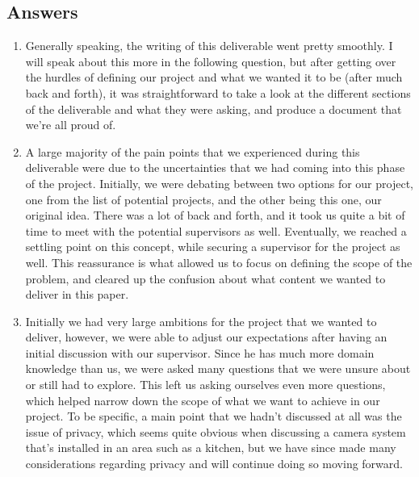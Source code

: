 \documentclass{article}
\begin{document}
\subsection*{Answers}
\begin{enumerate}
\item Generally speaking, the writing of this deliverable went pretty smoothly. I will speak about this more in the following question, but after getting over the hurdles of defining our project and what we wanted it to be (after much back and forth), it was straightforward to take a look at the different sections of the deliverable and what they were asking, and produce a document that we’re all proud of.
\item A large majority of the pain points that we experienced during this deliverable were due to the
uncertainties that we had coming into this phase of the project. Initially, we were debating between two options for our project, one from the list of potential projects, and the other being this one, our original idea. There was a lot of back and forth, and it took us quite a bit of time to meet with the potential supervisors as well. Eventually, we reached a settling point on this concept, while securing a supervisor for the project as well. This reassurance is what allowed us to focus on defining the scope of the problem, and cleared up the confusion about what content we wanted to deliver in this paper.
\item Initially we had very large ambitions for the project that we wanted to deliver, however, we were able to adjust our expectations after having an initial discussion with our supervisor. Since he has much more domain knowledge than us, we were asked many questions that we were unsure about or still had to explore. This left us asking ourselves even more questions, which helped narrow down the scope of what we want to achieve in our project. To be specific, a main point that we hadn’t discussed at all was the issue of privacy, which seems quite obvious when discussing a camera system that’s installed in an area such as a kitchen, but we have since made many considerations regarding privacy and will continue doing so moving forward.
\end{enumerate}
\end{document}
